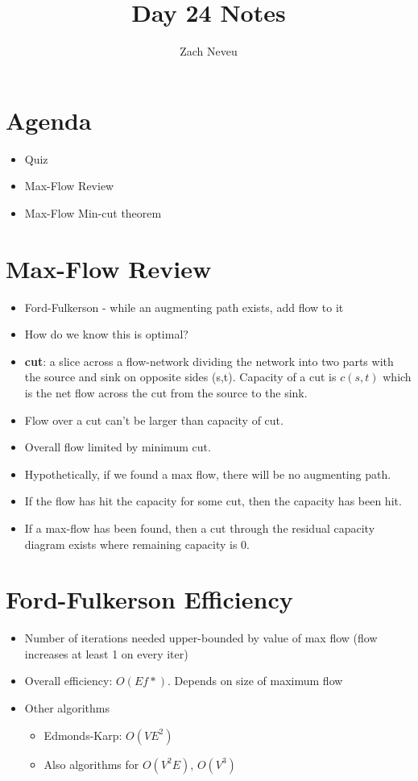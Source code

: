 \documentclass[12pt, letter]{article}
\author{Zach Neveu}
\title{ Day 24 Notes }
\begin{document}
\maketitle
\section{Agenda}%
\label{sec:agenda}
\begin{itemize}
	\item Quiz
	\item Max-Flow Review
	\item Max-Flow Min-cut theorem
\end{itemize}

\section{Max-Flow Review}%
\label{sec:max_flow_review}
\begin{itemize}
	\item Ford-Fulkerson - while an augmenting path exists, add flow to it
	\item How do we know this is optimal?
	\item \textbf{cut}: a slice across a flow-network dividing the network into two parts with the source and sink on opposite sides (s,t). Capacity of a cut is $c(s,t)$ which is the net flow across the cut from the source to the sink.
	\item Flow over a cut can't be larger than capacity of cut.
	\item Overall flow limited by minimum cut.
	\item Hypothetically, if we found a max flow, there will be no augmenting path.
	\item If the flow has hit the capacity for some cut, then the capacity has been hit.
	\item If a max-flow has been found, then a cut through the residual capacity diagram exists where remaining capacity is 0.
\end{itemize}

\section{Ford-Fulkerson Efficiency}%
\begin{itemize}
	\item Number of iterations needed upper-bounded by value of max flow (flow increases at least 1 on every iter)
	\item Overall efficiency: $O(Ef*)$. Depends on size of maximum flow
	\item Other algorithms
	\begin{itemize}
	 	\item Edmonds-Karp: $O(VE^2)$
		\item Also algorithms for $O(V^2E)$, $O(V^{3})$
	\end{itemize}
\end{itemize}
\end{document}
